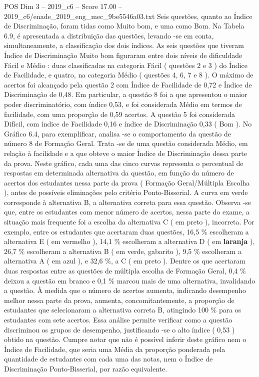 \begin{textsample}{POS Dim 3 – 2019\_c6 – Score 17.00 – 2019\_c6/enade\_2019\_eng\_mec\_9be5546a03.txt}
Seis questões, quanto ao Índice de Discriminação, foram tidas como Muito bom, e uma como Bom.
Na Tabela 6.9, é apresentada a distribuição das questões, levando -se em conta, simultaneamente, a classificação dos dois índices.
As seis questões que tiveram Índice de Discriminação Muito bom figuraram entre dois níveis de dificuldade Fácil e Médio : duas classificadas na categoria Fácil ( questões 2 e 3 ) do Índice de Facilidade, e quatro, na categoria Médio ( questões 4, 6, 7 e 8 ).
O máximo de acertos foi alcançado pela questão 2 com Índice de Facilidade de 0,72 e Índice de Discriminação de 0,48.
Em particular, a questão 8 foi a que apresentou o maior poder discriminatório, com índice 0,53, e foi considerada Médio em termos de facilidade, com uma proporção de 0,59 acertos.
A questão 5 foi considerada Difícil, com índice de Facilidade 0,16 e índice de Discriminação 0,33 ( Bom ).
No Gráfico 6.4, para exemplificar, analisa -se o comportamento da questão de número 8 de Formação Geral.
Trata -se de uma questão considerada Médio, em relação à facilidade e a que obteve o maior Índice de Discriminação dessa parte da prova.
Neste gráfico, cada uma das cinco curvas representa o percentual de respostas em determinada alternativa da questão, em função do número de acertos dos estudantes nessa parte da prova ( Formação Geral/Múltipla Escolha ), antes de possíveis eliminações pelo critério Ponto-Bisserial.
A curva em verde corresponde à alternativa B, a alternativa correta para essa questão.
Observa -se que, entre os estudantes com menor número de acertos, nessa parte do exame, a situação mais frequente foi a escolha da alternativa C ( em preto ), incorreta.
Por exemplo, entre os estudantes que acertaram duas questões, 16,5 \% escolheram a alternativa E ( em vermelho ), 14,1 \% escolheram a alternativa D ( em \textbf{laranja} ), 26,7 \% escolheram a alternativa B ( em verde, gabarito ), 9,5 \% escolheram a alternativa A ( em azul ), e 32,6 \%, a C ( em preto ).
Dentre os que acertaram duas respostas entre as questões de múltipla escolha de Formação Geral, 0,4 \% deixou a questão em branco e 0,1 \% marcou mais de uma alternativa, invalidando a questão.
À medida que o número de acertos aumenta, indicando desempenho melhor nessa parte da prova, aumenta, concomitantemente, a proporção de estudantes que selecionaram a alternativa correta B, atingindo 100 \% para os estudantes com sete acertos.
Essa análise permite verificar como a questão discriminou os grupos de desempenho, justificando -se o alto índice ( 0,53 ) obtido na questão.
Cumpre notar que não é possível inferir deste gráfico nem o Índice de Facilidade, que seria uma Média da proporção ponderada pela quantidade de estudantes com cada uma das notas, nem o Índice de Discriminação Ponto-Bisserial, por razão equivalente.

\end{textsample}
